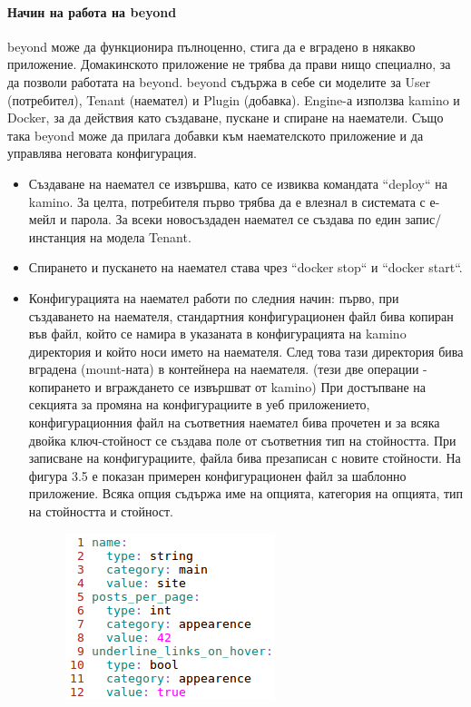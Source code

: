 \documentclass[pdftex,14pt,a4paper]{extreport}
\begin{document}
\paragraph {Начин на работа на beyond}
beyond може да функционира пълноценно, стига да е вградено в някакво приложение. Домакинското приложение не трябва да прави нищо специално, за да позволи работата на beyond. beyond съдържа в себе си моделите за User (потребител), Tenant (наемател) и Plugin (добавка). Engine-а използва kamino и Docker, за да действия като създаване, пускане и спиране на наематели. Също така beyond може да прилага добавки към наемателското приложение и да управлява неговата конфигурация.
\begin{itemize}
  \item Създаване на наемател се извършва, като се извиква командата ``deploy`` на kamino. За целта, потребителя първо трябва да е влезнал в системата с е-мейл и парола. За всеки новосъздаден наемател се създава по един запис/инстанция на модела Tenant.
  \item Спирането и пускането на наемател става чрез ``docker stop`` и ``docker start``.
  \item Конфигурацията на наемател работи по следния начин: първо, при създаването на наемателя, стандартния конфигурационен файл бива копиран във файл, който се намира в указаната в конфигурацията на kamino директория и който носи името на наемателя. След това тази директория бива вградена (mount-ната) в контейнера на наемателя. (тези две операции - копирането и вграждането се извършват от kamino) При достъпване на секцията за промяна на конфигурациите в уеб приложението, конфигурационния файл на съответния наемател бива прочетен и за всяка двойка ключ-стойност се създава поле от съответния тип на стойността. При записване на конфигурациите, файла бива презаписан с новите стойности. На фигура 3.5 е показан примерен конфигурационен файл за шаблонно приложение. Всяка опция съдържа име на опцията, категория на опцията, тип на стойността и стойност.
  \begin{figure}[h]
    \centering
    \includegraphics[scale=0.8]{./snippets/tenant_config}

\end{figure}
\end{itemize}
\end{document}
